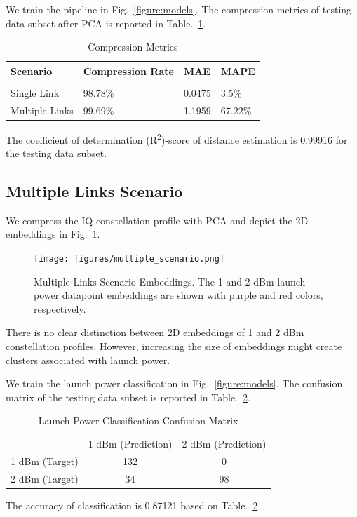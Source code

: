 \documentclass[lettersize,journal, one-column]{IEEEtran}
\begin{document}
We train the pipeline in Fig.~\ref{figure:models}.
The compression metrics of testing data subset after PCA is reported in Table.~\ref{table:compression}.
\begin{table}
    \centering
    \caption{Compression Metrics}
    \begin{tabular}{l l l l}
        \hline
        \hline
        Scenario & Compression Rate & MAE & MAPE \\
		\hline \\
        Single Link & 98.78\% & 0.0475 & 3.5\% \\
        Multiple Links & 99.69\% & 1.1959 & 67.22\% \\
        \hline
    \end{tabular}
    \label{table:compression}
\end{table}

The coefficient of determination (R\textsuperscript{2})-score of distance estimation is 0.99916 for the testing data subset.

\subsection{Multiple Links Scenario}
We compress the IQ constellation profile with PCA and depict the 2D embeddings in Fig.~\ref{figure:multiple_whole}.
\begin{figure}
	\centering
    \texttt{[image: figures/multiple\_scenario.png]}
    \caption{Multiple Links Scenario Embeddings. The 1 and 2 dBm launch power datapoint embeddings are shown with purple and red colors, respectively.}
	\label{figure:multiple_whole}
\end{figure}
There is no clear distinction between 2D embeddings of 1 and 2 dBm constellation profiles.
However, increasing the size of embeddings might create clusters associated with launch power.

We train the launch power classification in Fig.~\ref{figure:models}.
The confusion matrix of the testing data subset is reported in Table.~\ref{table:confusion_mat}.
\begin{table}
    \centering
    \caption{Launch Power Classification Confusion Matrix}
    \begin{tabular}{l l l}
        & 1 dBm (Prediction) & 2 dBm (Prediction) \\
        \cline{2-3}
        1 dBm (Target) & \multicolumn{1}{|c|}{132} & \multicolumn{1}{c|}{0} \\
        \cline{2-3}
        2 dBm (Target) & \multicolumn{1}{|c|}{34} & \multicolumn{1}{c|}{98} \\
        \cline{2-3}
    \end{tabular}
    \label{table:confusion_mat}
\end{table}
The accuracy of classification is 0.87121 based on Table.~\ref{table:confusion_mat}
\end{document}

